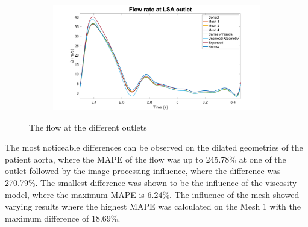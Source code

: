 \begin{figure}
\begin{subfigure}[b]{0.49\textwidth}
     \end{subfigure}
     \hfill
     \begin{subfigure}[b]{0.49\textwidth}
         \centering
         \includegraphics[width=\textwidth]{Figures/QLSA.png}
     \end{subfigure}
        \caption{The flow at the different outlets}
        \label{fig:flow}
\end{figure}

The most noticeable differences can be observed on the dilated geometries of the patient aorta, where the MAPE of the flow was up to  245.78\% at one of the outlet followed by the image processing influence, where the difference was 270.79\%. The smallest difference was shown to be the influence of the viscosity model, where the maximum MAPE is 6.24\%. The influence of the mesh showed varying results where the highest MAPE was calculated on the Mesh 1 with the maximum difference of 18.69\%. \par

\begin{table}[ht!]
\caption{The mean absolute percentage error at the outlets between the different models and control}
\label{tab:pererr}
\end{table}

